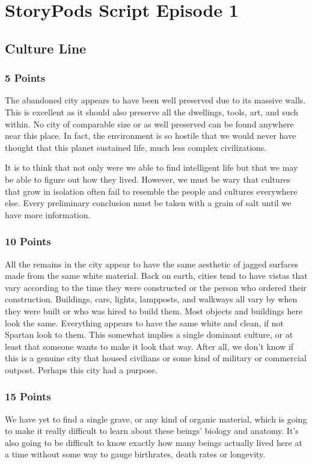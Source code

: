 \documentclass[conference]{IEEEtran}
\begin{document}
\appendices

\section{StoryPods Script Episode 1}
\label{StoryPods Script Episode 1}

\subsection{Culture Line}

\subsubsection*{5 Points}
The abandoned city appears to have been well preserved due to its massive walls. This is excellent as it should also preserve all the dwellings, tools, art, and such within. No city of comparable size or as well preserved can be found anywhere near this place. In fact, the environment is so hostile that we would never have thought that this planet sustained life, much less complex civilizations. 

It is to think that not only were we able to find intelligent life but that we may be able to figure out how they lived. However, we must be wary that cultures that grow in isolation often fail to resemble the people and cultures everywhere else. Every preliminary conclusion must be taken with a grain of salt until we have more information. 

\subsubsection*{10 Points}
All the remains in the city appear to have the same aesthetic of jagged surfaces made from the same white material. Back on earth, cities tend to have vistas that vary according to the time they were constructed or the person who ordered their construction. Buildings, cars, lights, lampposts, and walkways all vary by when they were built or who was hired to build them. Most objects and buildings here look the same. Everything appears to have the same white and clean, if not Spartan look to them. This somewhat implies a single dominant culture, or at least that someone wants to make it look that way. After all, we don’t know if this is a genuine city that housed civilians or some kind of military or commercial outpost.  Perhaps this city had a purpose.

\subsubsection*{15 Points}
We have yet to find a single grave, or any kind of organic material, which is going to make it really difficult to learn about these beings’ biology and anatomy. It’s also going to be difficult to know exactly how many beings actually lived here at a time without some way to gauge birthrates, death rates or longevity. 
\end{document}
